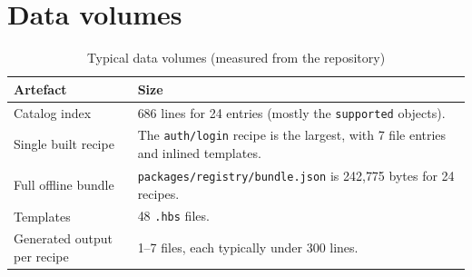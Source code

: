 \section{Data volumes}

\begin{table}[H]
\centering
\caption{Typical data volumes (measured from the repository)}
\begin{tabular}{@{}L{5cm}L{9.2cm}@{}}
\toprule
\textbf{Artefact} & \textbf{Size} \\
\midrule
Catalog index & 686 lines for 24 entries (mostly the \texttt{supported} objects). \\
Single built recipe & The \texttt{auth/login} recipe is the largest, with 7 file entries and inlined templates. \\
Full offline bundle & \texttt{packages/registry/bundle.json} is 242{,}775 bytes for 24 recipes. \\
Templates & 48 \texttt{.hbs} files. \\
Generated output per recipe & 1--7 files, each typically under 300 lines. \\
\bottomrule
\end{tabular}
\end{table}
